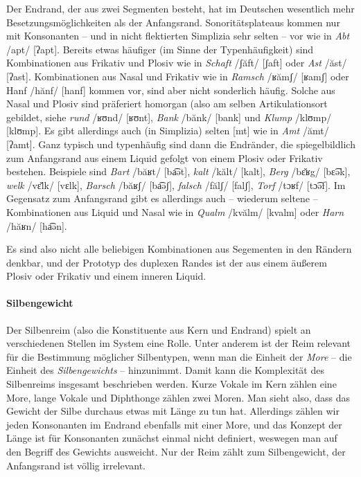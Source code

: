 Der Endrand, der aus zwei Segmenten besteht, hat im Deutschen wesentlich mehr Besetzungsmöglichkeiten als der Anfangsrand.
Sonoritätsplateaus kommen nur mit Konsonanten -- und in nicht flektierten Simplizia sehr selten -- vor wie in \textit{Abt} /apt/ [ʔapt].
Bereits etwas häufiger (im Sinne der Typenhäufigkeit) sind Kombinationen aus Frikativ und Plosiv wie in \textit{Schaft} /ʃăft/ [ʃaft] oder \textit{Ast} /ăst/ [ʔast].
Kombinationen aus Nasal und Frikativ wie in \textit{Ramsch} /ʁămʃ/ [ʁamʃ] oder Hanf /hănf/ [hanf] kommen vor, sind aber nicht sonderlich häufig.
Solche aus Nasal und Plosiv sind präferiert homorgan (also am selben Artikulationsort gebildet, siehe \textit{rund} /ʁʊnd/ [ʁʊnt], \textit{Bank} /bănk/ [bank] und \textit{Klump} /klʊmp/ [klʊmp].
Es gibt allerdings auch (in Simplizia) selten [mt] wie in \textit{Amt} /ămt/ [ʔamt].
Ganz typisch und typenhäufig sind dann die Endränder, die spiegelbildlich zum Anfangsrand aus einem Liquid gefolgt von einem Plosiv oder Frikativ bestehen.
Beispiele sind \textit{Bart} /băʁt/ [ba͡ət], \textit{kalt} /kălt/ [kalt], \textit{Berg} /bɛ̆ʁg/ [bɛ͡ək], \textit{welk} /vɛ̆lk/ [vɛlk], \textit{Barsch} /băʁʃ/ [ba͡əʃ], \textit{falsch} /fălʃ/ [falʃ], \textit{Torf} /tɔʁf/ [tɔ͡əf]. 
Im Gegensatz zum Anfangsrand gibt es allerdings auch -- wiederum seltene -- Kombinationen aus Liquid und Nasal wie in \textit{Qualm} /kvălm/ [kvalm] oder \textit{Harn} /hăʁn/ [ha͡ən].

Es sind also nicht alle beliebigen Kombinationen aus Segementen in den Rändern denkbar, und der Prototyp des duplexen Randes ist der aus einem äußerem Plosiv oder Frikativ und einem inneren Liquid.

\paragraph*{Silbengewicht}

Der Silbenreim (also die Konstituente aus Kern und Endrand) spielt an verschiedenen Stellen im System eine Rolle.
Unter anderem ist der Reim relevant für die Bestimmung möglicher Silbentypen, wenn man die Einheit der \textit{More} -- die Einheit des \textit{Silbengewichts} -- hinzunimmt.
Damit kann die Komplexität des Silbenreims insgesamt beschrieben werden.
Kurze Vokale im Kern zählen eine More, lange Vokale und Diphthonge zählen zwei Moren.
Man sieht also, dass das Gewicht der Silbe durchaus etwas mit Länge zu tun hat.
Allerdings zählen wir jeden Konsonanten im Endrand ebenfalls mit einer More, und das Konzept der Länge ist für Konsonanten zunächst einmal nicht definiert, weswegen man auf den Begriff des Gewichts ausweicht.
Nur der Reim zählt zum Silbengewicht, der Anfangsrand ist völlig irrelevant.

